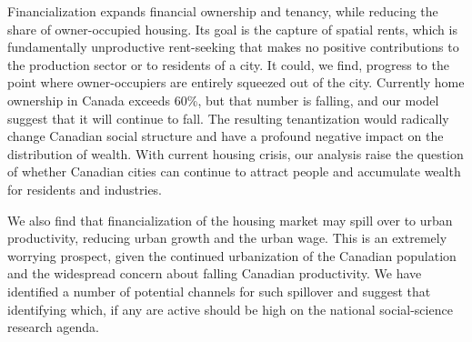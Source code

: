 Financialization expands financial ownership and tenancy, while reducing the share of owner-occupied housing. Its goal is the capture of spatial rents, which is fundamentally unproductive \gls{rent-seeking} that makes no positive contributions to the production sector or to residents of a city. It could, we find, progress to the point where owner-occupiers are entirely squeezed out of the city. 
 Currently home ownership in Canada exceeds 60\%, but that number is falling, and our model suggest that it will continue to fall. The resulting tenantization would radically change Canadian  social structure and have a profound negative impact on the distribution of wealth. With current housing crisis, our analysis  raise the question of whether Canadian cities can continue to attract people and accumulate wealth for  residents and industries. 

We also find that financialization of the housing market may spill over to urban productivity, reducing urban growth and the urban wage. This is an extremely worrying prospect, given the continued urbanization of the Canadian population and the widespread concern about falling Canadian productivity. We have identified a number of potential channels  for such spillover and suggest that identifying which, if any are active should be high on the national social-science research agenda.












